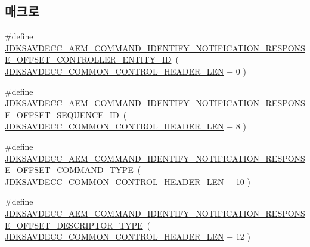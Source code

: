 \subsection*{매크로}
\begin{DoxyCompactItemize}
\item 
\#define \hyperlink{group__command__identify__notification_ga6c8e9f2563f4efa1d1859ef904ea7130}{J\+D\+K\+S\+A\+V\+D\+E\+C\+C\+\_\+\+A\+E\+M\+\_\+\+C\+O\+M\+M\+A\+N\+D\+\_\+\+I\+D\+E\+N\+T\+I\+F\+Y\+\_\+\+N\+O\+T\+I\+F\+I\+C\+A\+T\+I\+O\+N\+\_\+\+R\+E\+S\+P\+O\+N\+S\+E\+\_\+\+O\+F\+F\+S\+E\+T\+\_\+\+C\+O\+N\+T\+R\+O\+L\+L\+E\+R\+\_\+\+E\+N\+T\+I\+T\+Y\+\_\+\+ID}~( \hyperlink{group__jdksavdecc__avtp__common__control__header_gaae84052886fb1bb42f3bc5f85b741dff}{J\+D\+K\+S\+A\+V\+D\+E\+C\+C\+\_\+\+C\+O\+M\+M\+O\+N\+\_\+\+C\+O\+N\+T\+R\+O\+L\+\_\+\+H\+E\+A\+D\+E\+R\+\_\+\+L\+EN} + 0 )
\item 
\#define \hyperlink{group__command__identify__notification_gadfaa1a5f72a71012c4047ffd27de270b}{J\+D\+K\+S\+A\+V\+D\+E\+C\+C\+\_\+\+A\+E\+M\+\_\+\+C\+O\+M\+M\+A\+N\+D\+\_\+\+I\+D\+E\+N\+T\+I\+F\+Y\+\_\+\+N\+O\+T\+I\+F\+I\+C\+A\+T\+I\+O\+N\+\_\+\+R\+E\+S\+P\+O\+N\+S\+E\+\_\+\+O\+F\+F\+S\+E\+T\+\_\+\+S\+E\+Q\+U\+E\+N\+C\+E\+\_\+\+ID}~( \hyperlink{group__jdksavdecc__avtp__common__control__header_gaae84052886fb1bb42f3bc5f85b741dff}{J\+D\+K\+S\+A\+V\+D\+E\+C\+C\+\_\+\+C\+O\+M\+M\+O\+N\+\_\+\+C\+O\+N\+T\+R\+O\+L\+\_\+\+H\+E\+A\+D\+E\+R\+\_\+\+L\+EN} + 8 )
\item 
\#define \hyperlink{group__command__identify__notification_ga26ec4642a1fae16c1ef0dfb6f191fe24}{J\+D\+K\+S\+A\+V\+D\+E\+C\+C\+\_\+\+A\+E\+M\+\_\+\+C\+O\+M\+M\+A\+N\+D\+\_\+\+I\+D\+E\+N\+T\+I\+F\+Y\+\_\+\+N\+O\+T\+I\+F\+I\+C\+A\+T\+I\+O\+N\+\_\+\+R\+E\+S\+P\+O\+N\+S\+E\+\_\+\+O\+F\+F\+S\+E\+T\+\_\+\+C\+O\+M\+M\+A\+N\+D\+\_\+\+T\+Y\+PE}~( \hyperlink{group__jdksavdecc__avtp__common__control__header_gaae84052886fb1bb42f3bc5f85b741dff}{J\+D\+K\+S\+A\+V\+D\+E\+C\+C\+\_\+\+C\+O\+M\+M\+O\+N\+\_\+\+C\+O\+N\+T\+R\+O\+L\+\_\+\+H\+E\+A\+D\+E\+R\+\_\+\+L\+EN} + 10 )
\item 
\#define \hyperlink{group__command__identify__notification_ga8268594073e5dc639d021490e91f051b}{J\+D\+K\+S\+A\+V\+D\+E\+C\+C\+\_\+\+A\+E\+M\+\_\+\+C\+O\+M\+M\+A\+N\+D\+\_\+\+I\+D\+E\+N\+T\+I\+F\+Y\+\_\+\+N\+O\+T\+I\+F\+I\+C\+A\+T\+I\+O\+N\+\_\+\+R\+E\+S\+P\+O\+N\+S\+E\+\_\+\+O\+F\+F\+S\+E\+T\+\_\+\+D\+E\+S\+C\+R\+I\+P\+T\+O\+R\+\_\+\+T\+Y\+PE}~( \hyperlink{group__jdksavdecc__avtp__common__control__header_gaae84052886fb1bb42f3bc5f85b741dff}{J\+D\+K\+S\+A\+V\+D\+E\+C\+C\+\_\+\+C\+O\+M\+M\+O\+N\+\_\+\+C\+O\+N\+T\+R\+O\+L\+\_\+\+H\+E\+A\+D\+E\+R\+\_\+\+L\+EN} + 12 )

\end{DoxyCompactItemize}
